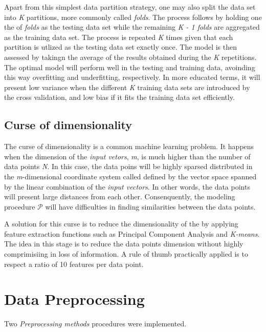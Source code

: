 Apart from this simplest data partition strategy, one may also split the data set
into \textit{K} partitions, more commonly called \textit{folds}. The process follows
by holding one the of \textit{folds} as the testing data set while the remaining
\textit{K - 1 folds} are aggregated as the training data set. The process is 
repeated \textit{K} times given that each partition is utlized as the testing data
set exactly once. The model is then assessed by takingn the average of the results
obtained during the \textit{K} repetitions. The optimal model will perform well
in the testing and training data, avoinding this way overfitting and underfitting, 
respectively. In more educated terms, it will present low variance when the 
different \textit{K} training data sets are introduced by the cross validation, and
low bias if it fits the training data set efficiently.


\subsection{Curse of dimensionality}

The curse of dimensionality is a common machine learning problem. It happens when
the dimension of the \textit{input vetors}, \textit{m}, is much higher than the 
number of data points \textit{N}. In this case, the data poins will be highly sparsed 
distributed in the \textit{m}-dimensional coordinate system called defined by the 
vector space spanned by the linear combination of the \textit{input vectors}.
In other words, the data points will present large distances from each other.
Consenquently, the modeling procedure $\mathcal{P}$ will have difficulties in
finding similarities between the data points.

A solution for this curse is to reduce the dimensionality of the by applying feature
extraction functions such as Principal Component Analysis and \textit{K-means}. The idea in this
stage is to reduce the data points dimension without highly comprimisiing in loss of
information. A rule of thumb practically applied is to respect a ratio of 10 features
per data point.

\section{Data Preprocessing}

Two \textit{Preprocessing methods} procedures were implemented.

